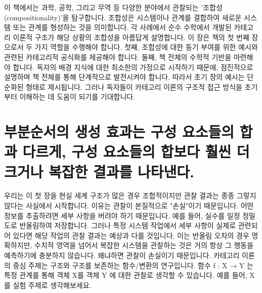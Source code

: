 \documentclass[11pt, a4paper, twoside, openany]{book}
\begin{document}
\tableofcontents
\clearpage


이 책에서는 과학, 공학, 그리고 무역 등 다양한 분야에서 관찰되는 '조합성(compositionality)'을 탐구합니다. 조합성은 시스템이나 관계를 결합하여 새로운 시스템 또는 관계를 형성하는 것을 의미합니다. 각 사례에서 순수 수학에서 개발된 카테고리 이론적 구조가 해당 상황의 조합성을 아름답게 설명합니다. 이 장은 책의 첫 번째 장으로서 두 가지 역할을 수행해야 합니다. 첫째, 조합성에 대한 동기 부여를 위한 예시와 관련된 카테고리적 공식화를 제공해야 합니다. 둘째, 책 전체의 수학적 기반을 마련해야 합니다. 독자의 배경 지식에 대한 최소한의 가정으로 시작하기 때문에, 점진적으로 설명하며 책 전체를 통해 단계적으로 발전시켜야 합니다. 따라서 초기 장의 예시는 단순화된 형태로 제시됩니다. 그러나 독자들이 카테고리 이론의 구조적 접근 방식을 초기부터 이해하는 데 도움이 되기를 기대합니다.


\section{부분순서의 생성 효과는 구성 요소들의 합과 다르게, 구성 요소들의 합보다 훨씬 더 크거나 복잡한 결과를 나타낸다.}
\par\medskip


우리는 이 첫 장을 현실 세계 구조가 많은 경우 조합적이지만 관찰 결과는 종종 그렇지 않다는 사실에서 시작합니다. 이유는 관찰이 본질적으로 "손실"이기 때문입니다. 어떤 정보를 추출하려면 세부 사항을 버려야 하기 때문입니다. 예를 들어, 실수를 일정 정밀도로 반올림하여 저장합니다. 그러나 특정 시스템 작업에서 세부 사항이 실제로 관련되어 있다면 해당 작업의 관찰 결과는 예상과 다를 것입니다. 이는 반올림 오차의 경우 명확하지만, 수치적 영역을 넘어서 복잡한 시스템을 관찰하는 것은 거의 항상 그 행동을 예측하기에 충분하지 않습니다. 왜냐하면 관찰이 손실이기 때문입니다. 카테고리 이론의 중심 주제는 구조와 구조를 보존하는 함수/변환의 연구입니다. 함수 f : X → Y 는 특정 관계를 통해 객체 X를 객체 Y 에 대한 관찰로 생각할 수 있습니다. 예를 들어, X를 실험 주제로 생각해보세요.
\end{document}
